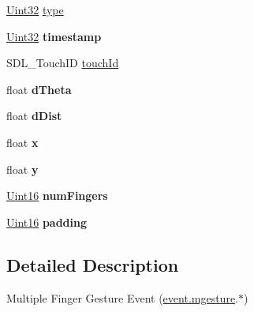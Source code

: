 \begin{DoxyCompactItemize}
\item 
\hyperlink{SDL__stdinc_8h_add440eff171ea5f55cb00c4a9ab8672d}{Uint32} \hyperlink{structSDL__MultiGestureEvent_ab0c7adc9a3f71cc3532bfe0ff8cc6120}{type}
\item 
\hypertarget{structSDL__MultiGestureEvent_a7e99a98debf3ce11f6d2a2fbb3637175}{}\hyperlink{SDL__stdinc_8h_add440eff171ea5f55cb00c4a9ab8672d}{Uint32} {\bfseries timestamp}\label{structSDL__MultiGestureEvent_a7e99a98debf3ce11f6d2a2fbb3637175}

\item 
S\+D\+L\+\_\+\+Touch\+I\+D \hyperlink{structSDL__MultiGestureEvent_aa15d1201559a3c9277082af71a972dc1}{touch\+Id}
\item 
\hypertarget{structSDL__MultiGestureEvent_a4f4a920dcf5205baa24a140df56f3153}{}float {\bfseries d\+Theta}\label{structSDL__MultiGestureEvent_a4f4a920dcf5205baa24a140df56f3153}

\item 
\hypertarget{structSDL__MultiGestureEvent_a351c29785c5ce3f68c4591a427265f14}{}float {\bfseries d\+Dist}\label{structSDL__MultiGestureEvent_a351c29785c5ce3f68c4591a427265f14}

\item 
\hypertarget{structSDL__MultiGestureEvent_a1708fc3c788fd12cc0beb5dc05cf31ca}{}float {\bfseries x}\label{structSDL__MultiGestureEvent_a1708fc3c788fd12cc0beb5dc05cf31ca}

\item 
\hypertarget{structSDL__MultiGestureEvent_a264602b9c5cc027eb6a283adda428454}{}float {\bfseries y}\label{structSDL__MultiGestureEvent_a264602b9c5cc027eb6a283adda428454}

\item 
\hypertarget{structSDL__MultiGestureEvent_a6b06cf80372ce3cad40110fdb6ef0353}{}\hyperlink{SDL__stdinc_8h_a31fcc0a076c9068668173ee26d33e42b}{Uint16} {\bfseries num\+Fingers}\label{structSDL__MultiGestureEvent_a6b06cf80372ce3cad40110fdb6ef0353}

\item 
\hypertarget{structSDL__MultiGestureEvent_a4804ec87789e697aba138c4888bb304b}{}\hyperlink{SDL__stdinc_8h_a31fcc0a076c9068668173ee26d33e42b}{Uint16} {\bfseries padding}\label{structSDL__MultiGestureEvent_a4804ec87789e697aba138c4888bb304b}

\end{DoxyCompactItemize}


\subsection{Detailed Description}
Multiple Finger Gesture Event (\hyperlink{unionSDL__Event_ac19b3c6a6b5181a51eb4fbe2cbe726a9}{event.\+mgesture}.$\ast$) 


